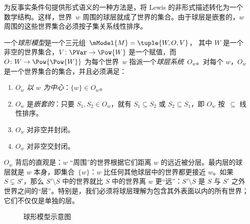 \documentclass[../../../include/open-logic-section]{subfiles}
\begin{document}


为反事实条件句提供形式语义的一种方法是，将 Lewis 的非形式描述转化为一个数学结构。这样，世界~$w$ 周围的球层就成了世界的集合。由于球层是嵌套的，$w$ 周围的这些世界集合必须按子集关系线性排序。

\begin{defn}
  一个\emph{球形模型}是一个三元组~$\mModel{M} = \tuple{W, O, V}$，
  其中 $W$ 是一个非空的世界集合，$V\colon \PVar \to \Pow{W}$ 是一个赋值，而 $O\colon W \to \Pow{\Pow{W}}$ 为每个世界~$w$ 指派一个\emph{球层系统}~$O_w$。对每个 $w$，$O_w$ 是一个世界集合的集合，并且必须满足：
  \begin{enumerate}
  \item $O_w$ \emph{以 $w$ 为中心}：$\{w\} \in O_w$。
  \item $O_w$ 是\emph{嵌套的}：只要 $S_1, S_2 \in O_w$，就有 $S_1 \subseteq S_2$ 或 $S_2 \subseteq S_1$，即 $O_w$ 按~$\subseteq$ 线性排序。
  \item $O_w$ 对非空并封闭。
  \item $O_w$ 对非空交封闭。
  \end{enumerate}
\end{defn}

$O_w$ 背后的直观是：$w$ “周围”的世界根据它们距离 $w$ 的远近被分层。最内层的球层就是 $w$ 本身，即集合~$\{w\}$：$w$ 比任何其他球层中的世界都更接近 $w$。如果 $S \subsetneq S'$，那么 $S' \setminus S$ 中的世界就比 $S$ 中的世界离 $w$ 更“远”：$S' \setminus S$ 是 $S$ 与 $S'$ 之外世界之间的“层”。特别是，我们必须将球层理解为包含其外表面以内的所有世界；它们不仅仅是单独的层。

\begin{figure}
\begin{center}
\caption{球形模型示意图}
\end{center}
\end{figure}
\end{document}
